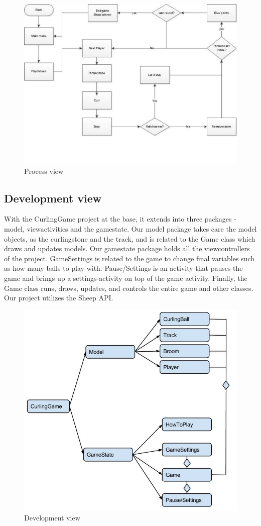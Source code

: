 \begin{figure}[ht!]
	\centering
	\includegraphics[width=150mm]{view.jpg}
	\caption{Process view}
	\label{fig:processView}
\end{figure}

\newpage
\subsection{Development view}
With the CurlingGame project at the base, it extends into three packages - model, viewactivities and the gamestate. Our model package takes care the model objects, as the curlingstone and the track, and is related to the Game class which draws and updates models. Our gamestate package holds all the viewcontrollers of the project. GameSettings is related to the game to change final variables such as how many balls to play with. Pause/Settings is an activity that pauses the game and brings up a settings-activity on top of the game activity. Finally, the Game class runs, draws, updates, and controls the entire game and other classes. Our project utilizes the Sheep API.\\

\begin{figure}[ht!]
	\centering
	\includegraphics[width=150mm]{development_view.jpg}
	\caption{Development view}
	\label{fig:developmentView}
\end{figure}
\newpage

